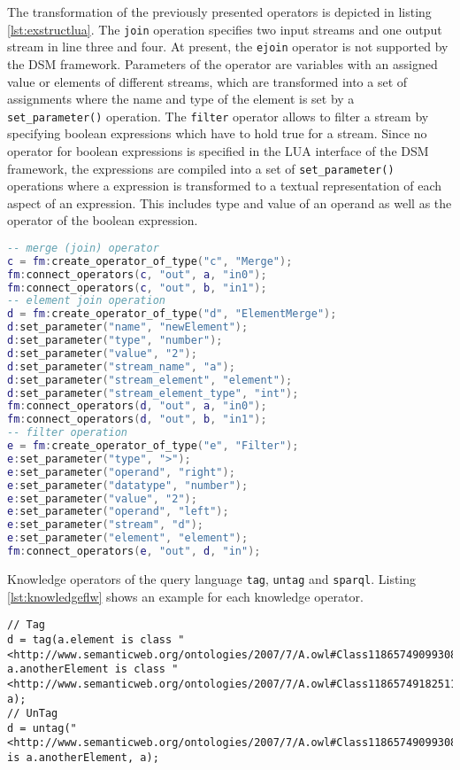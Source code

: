 The transformation of the previously presented operators is depicted in listing
\ref{lst:exstructlua}. The \texttt{join} operation specifies two input streams
and one output stream in line three and four. At present, the \texttt{ejoin} 
operator is not supported by the DSM framework. Parameters of the operator are
variables with an assigned value or elements of different streams, which are 
transformed into a set of assignments where the name and type of the element
is set by a \texttt{set\_parameter()} operation. The \texttt{filter} operator
allows to filter a stream by specifying boolean expressions which have to hold
true for a stream. Since no operator for boolean expressions is specified in the
LUA interface of the DSM framework, the expressions are compiled into a set of 
\texttt{set\_parameter()} operations where a expression is transformed to a 
textual representation of each aspect of an expression. This includes type and 
value of an operand as well as the operator of the boolean expression. 
\begin{lstlisting}[language=Lua, caption={\emph{Examples of Structural Operators  \texttt{join},  \texttt{ejoin} and  \texttt{filter} in LUA}},label={lst:exstructlua}]
-- merge (join) operator
c = fm:create_operator_of_type("c", "Merge");
fm:connect_operators(c, "out", a, "in0");
fm:connect_operators(c, "out", b, "in1");
-- element join operation 
d = fm:create_operator_of_type("d", "ElementMerge");
d:set_parameter("name", "newElement");
d:set_parameter("type", "number");
d:set_parameter("value", "2");
d:set_parameter("stream_name", "a");
d:set_parameter("stream_element", "element");
d:set_parameter("stream_element_type", "int");
fm:connect_operators(d, "out", a, "in0");
fm:connect_operators(d, "out", b, "in1");
-- filter operation 
e = fm:create_operator_of_type("e", "Filter");
e:set_parameter("type", ">");
e:set_parameter("operand", "right");
e:set_parameter("datatype", "number");
e:set_parameter("value", "2");
e:set_parameter("operand", "left");
e:set_parameter("stream", "d");
e:set_parameter("element", "element");
fm:connect_operators(e, "out", d, "in");
\end{lstlisting}
Knowledge operators of the query language \texttt{tag}, \texttt{untag} and 
\texttt{sparql}. Listing \ref{lst:knowledgeflw} shows an example for each
knowledge operator. 
\begin{lstlisting}[language=Flow, caption={\emph{Examples of Knowledge Operators in Flow}},label={lst:knowledgeflw}]
// Tag
d = tag(a.element is class "<http://www.semanticweb.org/ontologies/2007/7/A.owl#Class1186574909930821000>", a.anotherElement is class "<http://www.semanticweb.org/ontologies/2007/7/A.owl#Class1186574918251108000>", a);
// UnTag
d = untag("<http://www.semanticweb.org/ontologies/2007/7/A.owl#Class1186574909930821000>" is a.anotherElement, a);
\end{lstlisting}
